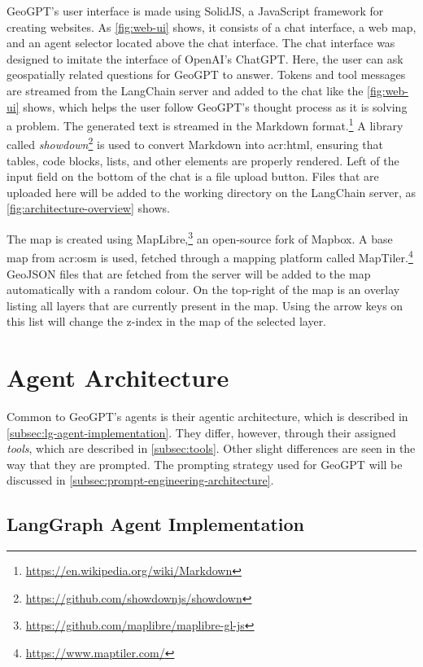 GeoGPT's user interface is made using SolidJS, a JavaScript framework for creating websites. As \autoref{fig:web-ui} shows, it consists of a chat interface, a web map, and an agent selector located above the chat interface. The chat interface was designed to imitate the interface of OpenAI's ChatGPT. Here, the user can ask geospatially related questions for GeoGPT to answer. Tokens and tool messages are streamed from the LangChain server and added to the chat like the \autoref{fig:web-ui} shows, which helps the user follow GeoGPT's thought process as it is solving a problem. The generated text is streamed in the Markdown format.\footnote{\url{https://en.wikipedia.org/wiki/Markdown}} A library called \textit{showdown}\footnote{\url{https://github.com/showdownjs/showdown}} is used to convert Markdown into \acrshort{acr:html}, ensuring that tables, code blocks, lists, and other elements are properly rendered. Left of the input field on the bottom of the chat is a file upload button. Files that are uploaded here will be added to the working directory on the LangChain server, as \autoref{fig:architecture-overview} shows.

The map is created using MapLibre,\footnote{\url{https://github.com/maplibre/maplibre-gl-js}} an open-source fork of Mapbox. A base map from \gls{acr:osm} is used, fetched through a mapping platform called MapTiler.\footnote{\url{https://www.maptiler.com/}} GeoJSON files that are fetched from the server will be added to the map automatically with a random colour. On the top-right of the map is an overlay listing all layers that are currently present in the map. Using the arrow keys on this list will change the z-index in the map of the selected layer.


\section{Agent Architecture}
\label{sec:agent-architecture}

Common to GeoGPT's agents is their agentic architecture, which is described in \autoref{subsec:lg-agent-implementation}. They differ, however, through their assigned \textit{tools}, which are described in \autoref{subsec:tools}. Other slight differences are seen in the way that they are prompted. The prompting strategy used for GeoGPT will be discussed in \autoref{subsec:prompt-engineering-architecture}.

\subsection{LangGraph Agent Implementation}
\label{subsec:lg-agent-implementation}

